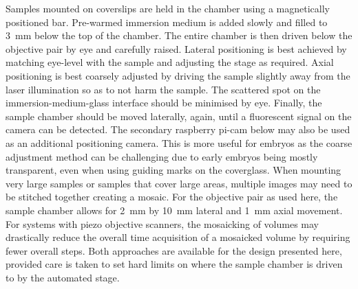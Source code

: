 Samples mounted on coverslips are held in the chamber using a magnetically positioned bar.
Pre-warmed immersion medium is added slowly and filled to \SI{3}{\milli\meter} below the top of the chamber.
The entire chamber is then driven below the objective pair by eye and carefully raised.
Lateral positioning is best achieved by matching eye-level with the sample and adjusting the stage as required.
Axial positioning is best coarsely adjusted by driving the sample slightly away from the laser illumination so as to not harm the sample.
The scattered spot on the immersion-medium-glass interface should be minimised by eye.
Finally, the sample chamber should be moved laterally, again, until a fluorescent signal on the camera can be detected.
The secondary raspberry pi-cam below may also be used as an additional positioning camera.
This is more useful for embryos as the coarse adjustment method can be challenging due to early embryos being mostly transparent, even when using guiding marks on the coverglass.
When mounting very large samples or samples that cover large areas, multiple images may need to be stitched together creating a mosaic.
For the objective pair as used here, the sample chamber allows for \SI{2}{\milli\metre} by \SI{10}{\milli\metre} lateral and \SI{1}{\milli\metre} axial movement.
For systems with piezo objective scanners, the mosaicking of volumes may drastically reduce the overall time acquisition of a mosaicked volume by requiring fewer overall steps.
Both approaches are available for the design presented here, provided care is taken to set hard limits on where the sample chamber is driven to by the automated stage.



